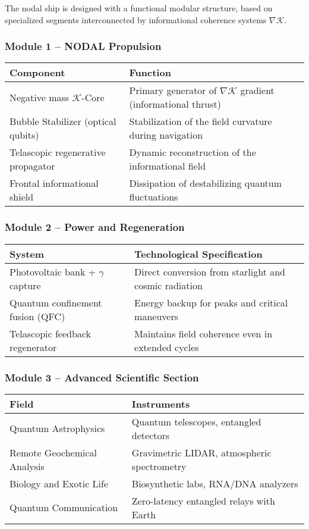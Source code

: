 \documentclass[12pt]{article}
\begin{document}
The nodal ship is designed with a functional modular structure, based on specialized segments interconnected by informational coherence systems $\nabla \mathcal{K}$.

\subsubsection*{Module 1 – NODAL Propulsion}
\begin{tabular}{ll}
\toprule
\textbf{Component} & \textbf{Function} \\
\midrule
Negative mass $\mathcal{K}$-Core & Primary generator of $\nabla \mathcal{K}$ gradient (informational thrust) \\
Bubble Stabilizer (optical qubits) & Stabilization of the field curvature during navigation \\
Telascopic regenerative propagator & Dynamic reconstruction of the informational field \\
Frontal informational shield & Dissipation of destabilizing quantum fluctuations \\
\bottomrule
\end{tabular}

\vspace{0.4cm}

\subsubsection*{Module 2 – Power and Regeneration}
\begin{tabular}{ll}
\toprule
\textbf{System} & \textbf{Technological Specification} \\
\midrule
Photovoltaic bank + $\gamma$ capture & Direct conversion from starlight and cosmic radiation \\
Quantum confinement fusion (QFC) & Energy backup for peaks and critical maneuvers \\
Telascopic feedback regenerator & Maintains field coherence even in extended cycles \\
\bottomrule
\end{tabular}

\vspace{0.4cm}

\subsubsection*{Module 3 – Advanced Scientific Section}
\begin{tabular}{ll}
\toprule
\textbf{Field} & \textbf{Instruments} \\
\midrule
Quantum Astrophysics & Quantum telescopes, entangled detectors \\
Remote Geochemical Analysis & Gravimetric LIDAR, atmospheric spectrometry \\
Biology and Exotic Life & Biosynthetic labs, RNA/DNA analyzers \\
Quantum Communication & Zero-latency entangled relays with Earth \\
\bottomrule
\end{tabular}
\end{document}
